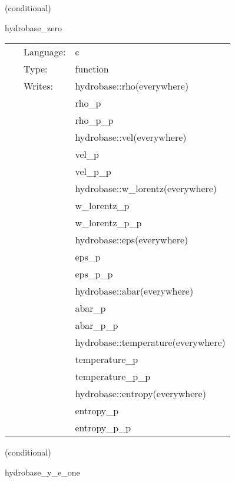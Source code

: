 \vspace{5mm}

   (conditional) 

\hspace{5mm} hydrobase\_zero 

\hspace{5mm}{\it set up vacuum hydro initial data } 


\hspace{5mm}

 \begin{tabular*}{160mm}{cll} 
~ & Language:  & c \\ 
~ & Type:  & function \\ 
~ & Writes:  & hydrobase::rho(everywhere) \\ 
~& ~ &rho\_p\\ 
~& ~ &rho\_p\_p\\ 
~& ~ &hydrobase::vel(everywhere)\\ 
~& ~ &vel\_p\\ 
~& ~ &vel\_p\_p\\ 
~& ~ &hydrobase::w\_lorentz(everywhere)\\ 
~& ~ &w\_lorentz\_p\\ 
~& ~ &w\_lorentz\_p\_p\\ 
~& ~ &hydrobase::eps(everywhere)\\ 
~& ~ &eps\_p\\ 
~& ~ &eps\_p\_p\\ 
~& ~ &hydrobase::abar(everywhere)\\ 
~& ~ &abar\_p\\ 
~& ~ &abar\_p\_p\\ 
~& ~ &hydrobase::temperature(everywhere)\\ 
~& ~ &temperature\_p\\ 
~& ~ &temperature\_p\_p\\ 
~& ~ &hydrobase::entropy(everywhere)\\ 
~& ~ &entropy\_p\\ 
~& ~ &entropy\_p\_p\\ 
\end{tabular*} 


\vspace{5mm}

   (conditional) 

\hspace{5mm} hydrobase\_y\_e\_one 

\hspace{5mm}{\it set electron fraction to 1 } 


